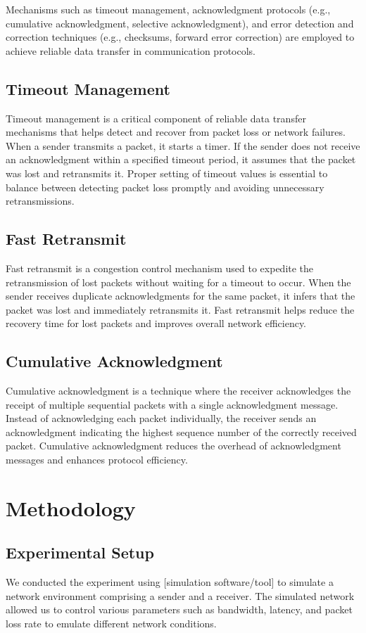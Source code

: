 \documentclass[11pt]{article}
\begin{document}
Mechanisms such as timeout management, acknowledgment protocols (e.g., cumulative acknowledgment, selective acknowledgment), and error detection and correction techniques (e.g., checksums, forward error correction) are employed to achieve reliable data transfer in communication protocols.

\subsection{Timeout Management}
Timeout management is a critical component of reliable data transfer mechanisms that helps detect and recover from packet loss or network failures. When a sender transmits a packet, it starts a timer. If the sender does not receive an acknowledgment within a specified timeout period, it assumes that the packet was lost and retransmits it. Proper setting of timeout values is essential to balance between detecting packet loss promptly and avoiding unnecessary retransmissions.

\subsection{Fast Retransmit}
Fast retransmit is a congestion control mechanism used to expedite the retransmission of lost packets without waiting for a timeout to occur. When the sender receives duplicate acknowledgments for the same packet, it infers that the packet was lost and immediately retransmits it. Fast retransmit helps reduce the recovery time for lost packets and improves overall network efficiency.

\subsection{Cumulative Acknowledgment}
Cumulative acknowledgment is a technique where the receiver acknowledges the receipt of multiple sequential packets with a single acknowledgment message. Instead of acknowledging each packet individually, the receiver sends an acknowledgment indicating the highest sequence number of the correctly received packet. Cumulative acknowledgment reduces the overhead of acknowledgment messages and enhances protocol efficiency.


\section{Methodology}
\subsection{Experimental Setup}
We conducted the experiment using [simulation software/tool] to simulate a network environment comprising a sender and a receiver. The simulated network allowed us to control various parameters such as bandwidth, latency, and packet loss rate to emulate different network conditions.
\end{document}
